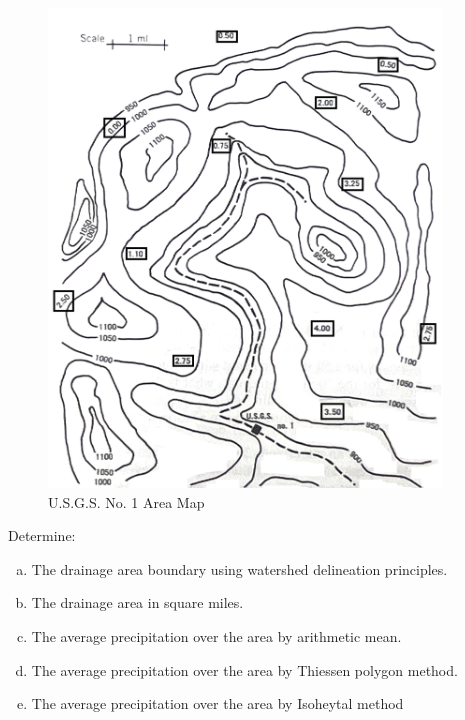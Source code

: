 \documentclass[12pt]{article}
\begin{document}
\begin{enumerate}
\begin{figure}[h!] %
   \centering
   \includegraphics[height=5in]{Map.jpg} 
   \caption{U.S.G.S. No. 1 Area Map}
   \label{fig:usgsmap}
\end{figure}

Determine:
    \begin{enumerate}[a)]
        \item The drainage area boundary using watershed delineation principles.
        \item The drainage area in square miles. 
        \item The average precipitation over the area by arithmetic mean. 
        \item The average precipitation over the area by Thiessen polygon method. 
        \item The average precipitation over the area by Isoheytal method
    \end{enumerate}



    
\end{enumerate}
\end{document}
